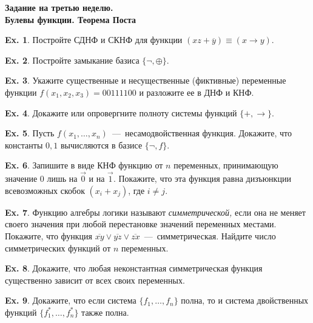 \documentclass[12pt,a5paper,fleqn]{article}
\theoremstyle{definition}
\newtheorem{Ex}{Ex.}
\begin{document}
\begin{center}
	{\bf \Large Задание на третью неделю. \\ \normalsize Булевы функции. Теорема Поста}
\end{center}
\vspace{0.4cm}

\begin{Ex}
	Постройте СДНФ и СКНФ для функции $(xz+\overline{y})\equiv(x\to y)$.
\end{Ex}

\begin{Ex}
	Постройте замыкание базиса $\{\neg,\oplus\}$.
\end{Ex}

\begin{Ex}
	Укажите существенные и несущественные (фиктивные) переменные функции 
	$f(x_1,x_2,x_3)=00111100$ и разложите ее в ДНФ и КНФ.
\end{Ex}

\begin{Ex}
	Докажите или опровергните полноту системы функций $\{+,\to\}$.
\end{Ex}

\begin{Ex}
	Пусть $f(x_1,\ldots,x_n)$~---~несамодвойственная функция. Докажите, что
	константы $0, 1$ вычисляются в базисе $\{\neg, f\}$.
\end{Ex}

\begin{Ex}
	Запишите в виде КНФ функцию от $n$ переменных, принимающую значение
	$0$ лишь на $\vec{0}$ и на $\vec{1}$. Покажите, что эта функция равна
	дизъюнкции всевозможных скобок $(x_i+x_j)$, где $i\neq j$. 
\end{Ex}

\begin{Ex}
	Функцию алгебры логики называют \textit{симметрической,} если она не 
	меняет своего значения при любой перестановке значений переменных местами.
	Покажите, что функция $\overline{xy}\vee\overline{yz}\vee\overline{zx}$~---~симметрическая.
	Найдите число симметрических функций от $n$ переменных.
\end{Ex}

\begin{Ex}
	Докажите, что любая неконстантная симметрическая функция существенно зависит
	от всех своих переменных.
\end{Ex}

\begin{Ex}
	Докажите, что если система $\{f_1,\ldots,f_n\}$ полна, то и система
	двойственных функций $\{f_1^*, \ldots, f_n^*\}$ также полна.
\end{Ex}
\end{document}
